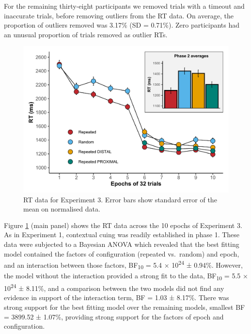 \documentclass[
  man,floatsintext]{apa7}
\begin{document}
For the remaining thirty-eight participants we removed trials with a timeout and inaccurate trials, before removing outliers from the RT data. On average, the proportion of outliers removed was 3.17\% (SD = 0.71\%). Zero participants had an unusual proportion of trials removed as outlier RTs.

\begin{figure}

{\centering \includegraphics{CCC_ms1_files/figure-latex/Exp3-RT-figure-1} 

}

\caption{RT data for Experiment 3. Error bars show standard error of the mean on normalised data.}\label{fig:Exp3-RT-figure}
\end{figure}



Figure \ref{fig:Exp3-RT-figure} (main panel) shows the RT data across the 10 epochs of Experiment 3. As in Experiment 1, contextual cuing was readily established in phase 1. These data were subjected to a Bayesian ANOVA which revealed that the best fitting model contained the factors of configuration (repeated vs.~random) and epoch, and an interaction between those factors, BF\textsubscript{10} = 5.4 × 10\textsuperscript{24} ± 0.94\%. However, the model without the interaction provided a strong fit to the data, BF\textsubscript{10} = 5.5 × 10\textsuperscript{24} ± 8.11\%, and a comparison between the two models did not find any evidence in support of the interaction term, BF = 1.03 ± 8.17\%. There was strong support for the best fitting model over the remaining models, smallest BF = 3899.52 ± 1.07\%, providing strong support for the factors of epoch and configuration.
\end{document}
